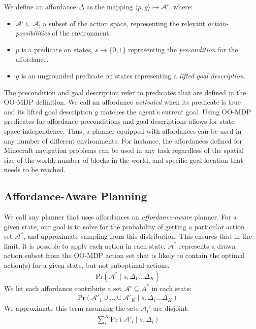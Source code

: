 \documentclass[letterpaper]{article}
\begin{document}
We define an affordance $\Delta$ 
as the mapping $\langle p,g\rangle \longmapsto \mathcal{A}'$,
where:
\begin{itemize}
\item[] $\mathcal{A}' \subseteq \mathcal{A}$, a subset of the action space, representing the relevant {\it action-possibilities} of the environment.
\item[] $p$ is a predicate on states, $s \longrightarrow \{$0$, 1\}$
  representing the {\em precondition} for the affordance.
\item[] $g$ is an ungrounded predicate on states representing a {\it lifted goal description}.
\end{itemize}
The precondition and goal description refer to predicates that are defined in the OO-MDP definition.
We call an affordance {\it activated} when its predicate is true and its lifted goal description $g$ matches the agent's current goal. 
Using OO-MDP predicates for affordance preconditions and goal descriptions 
allows for state space independence. Thus, a planner equipped with
affordances can be used in any number of different environments. For instance, the affordances defined for Minecraft 
navigation problems can be used in any task regardless of the spatial size of the world, 
number of blocks in the world, and specific goal location that needs to be reached.

\subsection{Affordance-Aware Planning}
We call any planner that
uses affordances an {\it affordance-aware} planner. For a given state, 
our goal is to solve for the probability of getting a particular action set $\mathcal{A}^*$, and approximate sampling
from this distribution. This ensures that in the limit, it is possible to apply each action in each state. $\mathcal{A}^*$ represents
a drawn action subset from the OO-MDP action set that is likely to contain the optimal action(s) for a given state,
but not suboptimal actions.
\begin{equation}
\text{Pr}(\mathcal{A}^* \mid s, \Delta_1 \dots \Delta_K)
\end{equation}
We let each affordance contribute a set $\mathcal{A}' \subseteq A^*$ in each state:
\begin{align}
\text{Pr}(\mathcal{A}'_1 \cup \ldots \cup \mathcal{A}'_K \mid s, \Delta_1 \dots \Delta_K)
\end{align}
We approximate this term assuming the sets $\mathcal{A}_i'$ are disjoint:
\begin{align}
\sum_i^K \text{Pr}(\mathcal{A}'_i \mid s, \Delta_i)
\end{align}
\end{document}
